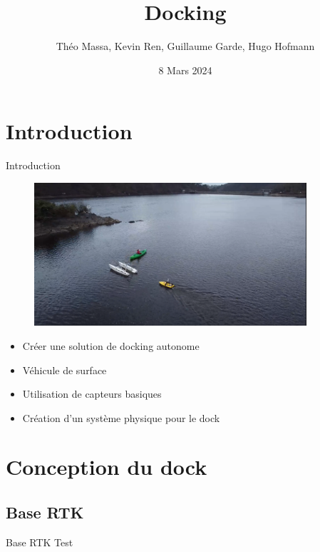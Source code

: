 \documentclass[pdftex,beamer,aspectratio=169]{beamer}
\title[Docking]{Docking}
\author[]{Théo Massa, Kevin Ren, Guillaume Garde, Hugo Hofmann}
\date{8 Mars 2024}
\institute{ENSTA Bretagne-Lab STICC-Université Bretagne Sud}
\theoremstyle{definition}
\theoremstyle{example}
\theoremstyle{plain}
\begin{document}
\frame{\titlepage}

\begin{frame}[allowframebreaks]
  \tableofcontents
\end{frame}

\section{Introduction} 
\begin{frame}{Introduction}
  \begin{minipage}{0.6\textwidth}
    \begin{figure}
      \centering
      \includegraphics[width=0.9\textwidth]{img_lac.png}
    \end{figure}
  \end{minipage}\hfill
  \begin{minipage}{0.39\textwidth}
    \begin{itemize}
      \item Créer une solution de docking autonome
      \item Véhicule de surface
      \item Utilisation de capteurs basiques
      \item Création d'un système physique pour le dock
    \end{itemize}
  \end{minipage}
\end{frame}

\section{Conception du dock}

\subsection{Base RTK}
\begin{frame}[fragile]{Base RTK}
  Test
\end{frame}
\end{document}
